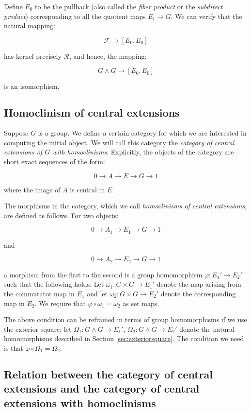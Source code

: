 \documentclass{ucetd}
\begin{document}
Define $E_0$ to be the pullback (also called the {\em fiber product}
or the {\em subdirect product}) corresponding to all the quotient maps
$E_i \to G$. We can verify that the natural mapping:

$$\mathcal{F} \to [E_0,E_0]$$

has kernel precisely $\mathcal{R}$, and hence, the mapping:

$$G \wedge G \to [E_0,E_0]$$

is an isomorphism.

\subsection{Homoclinism of central extensions}\label{sec:homoclinism-central-extensions}

Suppose $G$ is a group. We define a certain category for which we are
interested in computing the initial object. We will call this category
the {\em category of central extensions of $G$ with homoclinisms}. Explicitly,
the objects of the category are short exact sequences of the form:

$$0 \to A \to E \to G \to 1$$

where the image of $A$ is central in $E$.

The morphisms in the category, which we call {\em homoclinisms of
  central extensions}, are defined as follows. For two objects:

$$0 \to A_1 \to E_1 \to G \to 1$$

and

$$0 \to A_2 \to E_2 \to G \to 1$$

a morphism from the first to the second is a group homomorphism
$\varphi: E_1' \to E_2'$ such that the following holds. Let $\omega_1:
G \times G \to E_1'$ denote the map arising from the commutator map in
$E_1$ and let $\omega_2: G \times G \to E_2'$ denote the corresponding
map in $E_2$. We require that $\varphi \circ \omega_1 = \omega_2$ as set maps.

The above condition can be reframed in terms of group homomorphisms if
we use the exterior square: let $\Omega_1: G \wedge G \to E_1'$,
$\Omega_2: G \wedge G \to E_2'$ denote the natural homomorphisms
described in Section \ref{sec:exteriorsquare}. The condition we need
is that $\varphi \circ \Omega_1 = \Omega_2$.

\subsection{Relation between the category of central extensions and the category of central extensions with homoclinisms}
\end{document}
